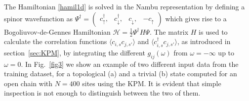 The Hamiltonian \eqref{hamil1d} is solved in the Nambu representation by defining
a spinor wavefunction as
$
\Psi^\dagger =
\begin{pmatrix}
c^\dagger_{\uparrow}, &
c^\dagger_{\downarrow} ,&
c_{\downarrow}, &
-c_{\uparrow}
\end{pmatrix}
$
which gives rise to a Bogoliuvov-de-Gennes Hamiltonian
$\mathcal{H} = \frac{1}{2}\Psi^\dagger H \Psi$.
The matrix $H$ is used to calculate the correlation functions
$\langle c_{i,s} c_{j,s'} \rangle$
and
$\langle c^\dagger_{i,s} c_{j,s'} \rangle$,
as introduced in section~\ref{sec:KPM}, by integrating the different
$g_{ij}(\omega)$ from $\omega=-\infty$ up to $\omega=0$.
In Fig.~\ref{fig3} we show an example of two different input data from the
training dataset, for a topological (a) and a trivial (b) state computed for an
open chain with $N=400$ sites using the KPM.
It is evident that simple inspection is not enough to distinguish between the two
of them. 

